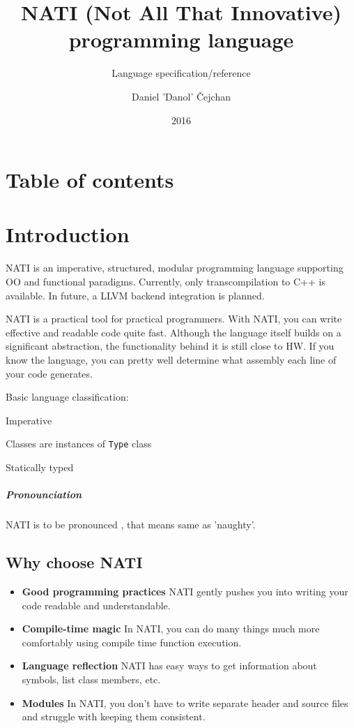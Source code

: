 




\setlength\extrarowheight{2pt}

\title{NATI (Not All That Innovative) programming language}
\subtitle{Language specification/reference}
\author{Daniel 'Danol' Čejchan}
\date{2016}



\mainpage

\chapter{Table of contents}
\makeatletter
{}
\makeatother

\chapter{Introduction}
NATI is an imperative, structured, modular programming language supporting OO and functional paradigms. Currently, only transcompilation to C++ is available. In future, a LLVM backend integration is planned.

NATI is a practical tool for practical programmers. With NATI, you can write effective and readable code quite fast. Although the language itself builds on a significant abstraction, the functionality behind it is still close to HW. If you know the language, you can pretty well determine what assembly each line of your code generates.

Basic language classification:
\begin{compactitem}
	\item Imperative
	\item Classes are instances of \verb|Type| class
	\item Statically typed
\end{compactitem}

\paragraph{Pronounciation}
NATI is to be pronounced , that means same as 'naughty'.

\section{Why choose NATI}
\begin{itemize}
	\item \textbf{Good programming practices} NATI gently pushes you into writing your code readable and understandable.
	\item \textbf{Compile-time magic} In NATI, you can do many things much more comfortably using compile time function execution.
	\item \textbf{Language reflection} NATI has easy ways to get information about symbols, list class members, etc.
	\item \textbf{Modules} In NATI, you don't have to write separate header and source files and struggle with keeping them consistent.
\end{itemize}

